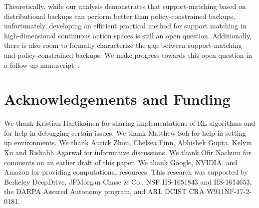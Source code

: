 Theoretically, while our analysis demonstrates that support-matching based on distributional backups can perform better than policy-constrained backups, unfortunately, developing an efficient practical method for support matching in high-dimensional continuous action spaces is still an open question. Additionally, there is also room to formally characterize the gap between support-matching and policy-constrained backups. We make progress towards this open question in a follow-up manuscript~\citep{singh2022reds}.  

\section*{Acknowledgements and Funding}
We thank Kristian Hartikainen for sharing implementations of RL algorithms and for help in debugging certain issues. We thank Matthew Soh for help in setting up environments. We thank Aurick Zhou, Chelsea Finn, Abhishek Gupta, Kelvin Xu and Rishabh Agarwal for informative discussions. We thank Ofir Nachum for comments on an earlier draft of this paper. We thank Google, NVIDIA, and Amazon for providing computational resources. This research was supported by Berkeley DeepDrive, JPMorgan Chase \& Co., NSF IIS-1651843 and IIS-1614653, the DARPA Assured Autonomy program, and ARL DCIST CRA W911NF-17-2-0181.